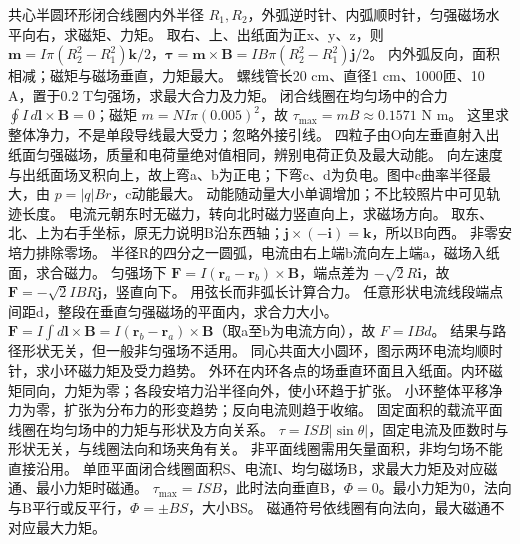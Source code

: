 \problemtext 共心半圆环形闭合线圈内外半径 $R_1,R_2$，外弧逆时针、内弧顺时针，匀强磁场水平向右，求磁矩、力矩。
\workings 取右、上、出纸面为正x、y、z，则 $\bm m=I\pi(R_2^2-R_1^2)\bm k/2$，$\bm\tau=\bm m\times\bm B=IB\pi(R_2^2-R_1^2)\bm j/2$。
\crosscheck 内外弧反向，面积相减；磁矩与磁场垂直，力矩最大。
\problemtext 螺线管长20 cm、直径1 cm、1000匝、10 A，置于0.2 T匀强场，求最大合力及力矩。
\workings 闭合线圈在均匀场中的合力 $\oint I\,d\bm l\times\bm B=0$；磁矩 $m=NI\pi(0.005)^2$，故 $\tau_{\max}=mB\approx0.1571$ N m。
\crosscheck 这里求整体净力，不是单段导线最大受力；忽略外接引线。
\problemtext 四粒子由O向左垂直射入出纸面匀强磁场，质量和电荷量绝对值相同，辨别电荷正负及最大动能。
\workings 向左速度与出纸面场叉积向上，故上弯a、b为正电；下弯c、d为负电。图中c曲率半径最大，由 $p=|q|Br$，c动能最大。
\crosscheck 动能随动量大小单调增加；不比较照片中可见轨迹长度。
\problemtext 电流元朝东时无磁力，转向北时磁力竖直向上，求磁场方向。
\workings 取东、北、上为右手坐标，原无力说明B沿东西轴；$\bm j\times(-\bm i)=\bm k$，所以B向西。
\crosscheck 非零安培力排除零场。
\problemtext 半径R的四分之一圆弧，电流由右上端b流向左上端a，磁场入纸面，求合磁力。
\workings 匀强场下 $\bm F=I(\bm r_a-\bm r_b)\times\bm B$，端点差为 $-\sqrt2R\bm i$，故 $\bm F=-\sqrt2IBR\bm j$，竖直向下。
\crosscheck 用弦长而非弧长计算合力。
\problemtext 任意形状电流线段端点间距d，整段在垂直匀强磁场的平面内，求合力大小。
\workings $\bm F=I\int d\bm l\times\bm B=I(\bm r_b-\bm r_a)\times\bm B$（取a至b为电流方向），故 $F=IBd$。
\crosscheck 结果与路径形状无关，但一般非匀强场不适用。
\problemtext 同心共面大小圆环，图示两环电流均顺时针，求小环磁力矩及受力趋势。
\workings 外环在内环各点的场垂直环面且入纸面。内环磁矩同向，力矩为零；各段安培力沿半径向外，使小环趋于扩张。
\crosscheck 小环整体平移净力为零，扩张为分布力的形变趋势；反向电流则趋于收缩。
\problemtext 固定面积的载流平面线圈在均匀场中的力矩与形状及方向关系。
\workings $\tau=ISB|\sin\theta|$，固定电流及匝数时与形状无关，与线圈法向和场夹角有关。
\crosscheck 非平面线圈需用矢量面积，非均匀场不能直接沿用。
\problemtext 单匝平面闭合线圈面积S、电流I、均匀磁场B，求最大力矩及对应磁通、最小力矩时磁通。
\workings $\tau_{\max}=ISB$，此时法向垂直B，$\Phi=0$。最小力矩为0，法向与B平行或反平行，$\Phi=\pm BS$，大小BS。
\crosscheck 磁通符号依线圈有向法向，最大磁通不对应最大力矩。
